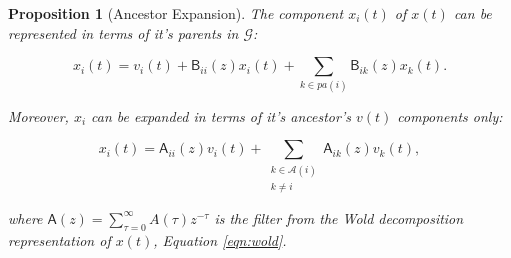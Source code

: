 \documentclass{statsoc}
\def\gcg{\mathcal{G}}  %
\def\B{\mathsf{B}}  %
\def\A{\mathsf{A}}  %
\newcommand{\pa}[1]{pa(#1)}  %
\newcommand{\anc}[1]{\mathcal{A}(#1)}  %
\newtheorem{proposition}{Proposition}
\begin{document}
\begin{proposition}[Ancestor Expansion]
  \label{prop:parent_expanding}
  The component $x_i(t)$ of $x(t)$ can be represented in terms of it's
  parents in $\gcg$:

  \begin{equation}
    \label{eqn:parent_expansion}
    x_i(t) = v_i(t) + \B_{ii}(z)x_i(t) + \sum_{k \in \pa{i}}\B_{ik}(z)x_k(t).
  \end{equation}

  Moreover, $x_i$ can be expanded in terms of it's ancestor's $v(t)$
  components only:

  \begin{equation}
    \label{eqn:ancestor_expansion}
    x_i(t) = \A_{ii}(z)v_i(t) + \sum_{\substack{k \in \anc{i} \\ k \ne i}}\A_{ik}(z)v_k(t),
  \end{equation}

  where $\A(z) = \sum_{\tau = 0}^\infty A(\tau)z^{-\tau}$ is the filter from
  the Wold decomposition representation of $x(t)$, Equation
  \eqref{eqn:wold}.
\end{proposition}
\end{document}
